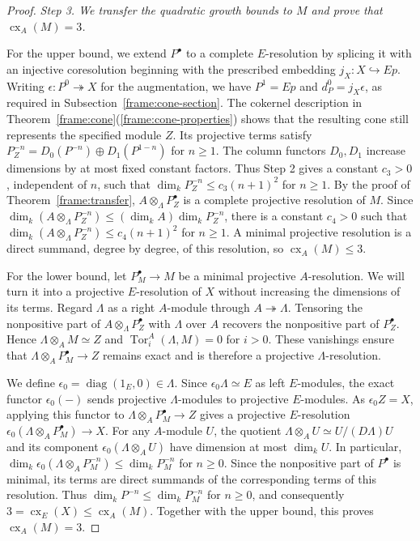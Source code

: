 \documentclass[11pt]{article}
\begin{document}
\begin{proof}
\smallskip\noindent
\emph{Step 3. We transfer the quadratic growth bounds to $M$ and prove that $\operatorname{cx}_A(M)=3$.}
\par\nobreak\smallskip\nobreak
\noindent
For the upper bound, we extend $P^\bullet$ to a complete $E$-resolution
by splicing it with an injective coresolution beginning with the
prescribed embedding $j_X:X\hookrightarrow Ep$.
Writing $\epsilon:P^0\twoheadrightarrow X$ for the augmentation,
we have $P^1=Ep$ and $d_P^0=j_X\epsilon$, as required in
Subsection~\ref{frame:cone-section}. The cokernel description in
Theorem~\ref{frame:cone}\textup{(\ref{frame:cone-properties})}
shows that the resulting cone still represents the specified module $Z$.
Its projective terms satisfy
$P_Z^{-n}=D_0(P^{-n})\oplus D_1(P^{1-n})$ for $n\ge1$.
The column functors $D_0,D_1$ increase dimensions by at most fixed
constant factors. Thus Step 2 gives a constant $c_3>0$, independent
of $n$, such that $\dim_kP_Z^{-n}\le c_3(n+1)^2$ for $n\ge1$.
By the proof of Theorem~\ref{frame:transfer},
$A\otimes_\Lambda P_Z^\bullet$ is a complete projective resolution
of $M$. Since
$\dim_k(A\otimes_\Lambda P_Z^{-n})\le(\dim_kA)\dim_kP_Z^{-n}$,
there is a constant $c_4>0$ such that
$\dim_k(A\otimes_\Lambda P_Z^{-n})\le c_4(n+1)^2$ for $n\ge1$.
A minimal projective resolution is a direct summand, degree by
degree, of this resolution, so $\operatorname{cx}_A(M)\le3$.

For the lower bound, let $P_M^\bullet\to M$ be a minimal projective
$A$-resolution. We will turn it into a projective $E$-resolution of
$X$ without increasing the dimensions of its terms.
Regard $\Lambda$ as a right $A$-module through
$A\twoheadrightarrow\Lambda$. Tensoring the nonpositive part of
$A\otimes_\Lambda P_Z^\bullet$ with $\Lambda$ over $A$ recovers
the nonpositive part of $P_Z^\bullet$. Hence
$\Lambda\otimes_AM\simeq Z$ and
$\operatorname{Tor}_i^A(\Lambda,M)=0$ for $i>0$.
These vanishings ensure that
$\Lambda\otimes_AP_M^\bullet\to Z$ remains exact and is therefore
a projective $\Lambda$-resolution.

We define $\epsilon_0=\operatorname{diag}(1_E,0)\in\Lambda$.
Since $\epsilon_0\Lambda\simeq E$ as left $E$-modules, the exact
functor $\epsilon_0(-)$ sends projective $\Lambda$-modules to
projective $E$-modules. As $\epsilon_0Z=X$, applying this functor
to $\Lambda\otimes_AP_M^\bullet\to Z$ gives a projective $E$-resolution
$\epsilon_0(\Lambda\otimes_AP_M^\bullet)\to X$.
For any $A$-module $U$, the quotient
$\Lambda\otimes_AU\simeq U/(D\Lambda)U$ and its component
$\epsilon_0(\Lambda\otimes_AU)$ have dimension at most $\dim_kU$.
In particular,
$\dim_k\epsilon_0(\Lambda\otimes_AP_M^{-n})\le\dim_kP_M^{-n}$ for $n\ge0$.
Since the nonpositive part of $P^\bullet$ is minimal, its terms
are direct summands of the corresponding terms of this resolution.
Thus
$\dim_kP^{-n}\le\dim_kP_M^{-n}$ for $n\ge0$, and consequently
$3=\operatorname{cx}_E(X)\le\operatorname{cx}_A(M)$.
Together with the upper bound, this proves $\operatorname{cx}_A(M)=3$.
\end{proof}
\end{document}
